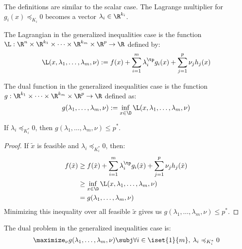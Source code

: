 The definitions are similar to the scalar case. The Lagrange multiplier for $g_i(x)\preccurlyeq_{K_i}0$ becomes a vector $\lambda_i\in\R^{k_i}$.
\begin{definition}
    The Lagrangian in the generalized inequalities case is the function $\L:\R^n\times\R^{k_1}\times\dots\times\R^{k_m}\times\R^p\to\R$ defined by:
    \begin{equation*}
        \L(x, \lambda_1, \dots, \lambda_m, \nu) := f(x) + \sum_{i=1}^m\lambda_i^\tp g_i(x) + \sum_{j=1}^p \nu_jh_j(x)
    \end{equation*}
\end{definition}

\begin{definition}
    The dual function in the generalized inequalities case is the function $g:\R^{k_1}\times\dots\times\R^{k_m}\times\R^p\to\R$ defined as:
    \begin{equation*}
        g(\lambda_1,\dots,\lambda_m,\nu) := \inf_{x\in\D} \L(x,\lambda_1, \dots, \lambda_m, \nu)
    \end{equation*}
\end{definition}

\begin{property}
    If $\lambda_i\preccurlyeq_{K_i^*}0$, then $g(\lambda_1, \dots, \lambda_m,\nu)\leq p^*$.
\end{property}
\begin{proof}
    If $\tilde{x}$ is feasible and $\lambda_i\preccurlyeq_{K_i^*}0$, then:
    \begin{align*}
        f(\tilde{x}) &\geq f(\tilde{x}) + \sum_{i=1}^m\lambda_i^\tp g_i(\tilde{x}) + \sum_{j=1}^p \nu_jh_j(\tilde{x})\\
        &\geq \inf_{x\in\D} \L(x, \lambda_1, \dots, \lambda_m,\nu)\\
        &= g(\lambda_1, \dots, \lambda_m, \nu)
    \end{align*}
    Minimizing this inequality over all feasible $\tilde{x}$ gives us $g(\lambda_1, \dots, \lambda_m,\nu)\leq p^*$.
\end{proof}

\begin{definition}
    The dual problem in the generalized inequalities case is:
    \begin{equation*}
        \maximize_\nu g(\lambda_1, \dots, \lambda_m, \nu) \subj \forall i\in\iset{1}{m}, \: \lambda_i \preccurlyeq_{K_i^*}0
    \end{equation*}
\end{definition}

